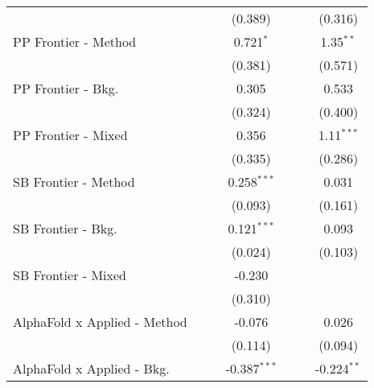 \begin{tabular}{lcccccc}
                                  &                &               & (0.389)        &                &               & (0.316)\\   
   PP Frontier - Method           &                &               & 0.721$^{*}$    &                &               & 1.35$^{**}$\\   
                                  &                &               & (0.381)        &                &               & (0.571)\\   
   PP Frontier - Bkg.             &                &               & 0.305          &                &               & 0.533\\   
                                  &                &               & (0.324)        &                &               & (0.400)\\   
   PP Frontier - Mixed            &                &               & 0.356          &                &               & 1.11$^{***}$\\   
                                  &                &               & (0.335)        &                &               & (0.286)\\   
   SB Frontier - Method           &                &               & 0.258$^{***}$  &                &               & 0.031\\   
                                  &                &               & (0.093)        &                &               & (0.161)\\   
   SB Frontier - Bkg.             &                &               & 0.121$^{***}$  &                &               & 0.093\\   
                                  &                &               & (0.024)        &                &               & (0.103)\\   
   SB Frontier - Mixed            &                &               & -0.230         &                &               &   \\   
                                  &                &               & (0.310)        &                &               &   \\   
   AlphaFold x Applied - Method   &                &               & -0.076         &                &               & 0.026\\   
                                  &                &               & (0.114)        &                &               & (0.094)\\   
   AlphaFold x Applied - Bkg.     &                &               & -0.387$^{***}$ &                &               & -0.224$^{**}$\\   

\end{tabular}
